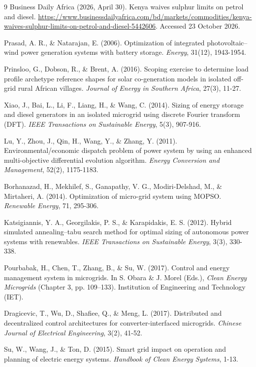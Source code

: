 \documentclass[final,3p,times]{elsarticle}
\begin{document}
\begin{thebibliography}{9}
Business Daily Africa (2026, April 30). Kenya waives sulphur limits on petrol and diesel. \url{https://www.businessdailyafrica.com/bd/markets/commodities/kenya-waives-sulphur-limits-on-petrol-and-diesel-5442606}. Accessed 23 October 2026.

Prasad, A. R., \& Natarajan, E. (2006). Optimization of integrated photovoltaic–wind power generation systems with battery storage. \textit{Energy}, 31(12), 1943-1954.

Prinsloo, G., Dobson, R., \& Brent, A. (2016). Scoping exercise to determine load profile archetype reference shapes for solar co-generation models in isolated off-grid rural African villages. \textit{Journal of Energy in Southern Africa}, 27(3), 11-27.

Xiao, J., Bai, L., Li, F., Liang, H., \& Wang, C. (2014). Sizing of energy storage and diesel generators in an isolated microgrid using discrete Fourier transform (DFT). \textit{IEEE Transactions on Sustainable Energy}, 5(3), 907-916.

Lu, Y., Zhou, J., Qin, H., Wang, Y., \& Zhang, Y. (2011). Environmental/economic dispatch problem of power system by using an enhanced multi-objective differential evolution algorithm. \textit{Energy Conversion and Management}, 52(2), 1175-1183.

Borhanazad, H., Mekhilef, S., Ganapathy, V. G., Modiri-Delshad, M., \& Mirtaheri, A. (2014). Optimization of micro-grid system using MOPSO. \textit{Renewable Energy}, 71, 295-306.

Katsigiannis, Y. A., Georgilakis, P. S., \& Karapidakis, E. S. (2012). Hybrid simulated annealing–tabu search method for optimal sizing of autonomous power systems with renewables. \textit{IEEE Transactions on Sustainable Energy}, 3(3), 330-338.

Pourbabak, H., Chen, T., Zhang, B., \& Su, W. (2017). Control and energy management system in microgrids. In S. Obara \& J. Morel (Eds.), \textit{Clean Energy Microgrids} (Chapter 3, pp. 109--133). Institution of Engineering and Technology (IET).

Dragicevic, T., Wu, D., Shafiee, Q., \& Meng, L. (2017). Distributed and decentralized control architectures for converter-interfaced microgrids. \textit{Chinese Journal of Electrical Engineering}, 3(2), 41-52.

Su, W., Wang, J., \& Ton, D. (2015). Smart grid impact on operation and planning of electric energy systems. \textit{Handbook of Clean Energy Systems}, 1-13.


\end{thebibliography}
\end{document}
